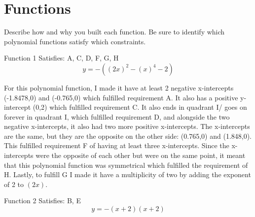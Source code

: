 \documentclass[pstricks,border=11pt]{article}
\begin{document}
\vspace{15mm}
\section{Functions}
Describe how and why you built each function. Be sure to identify which polynomial functions satisfy which constraints.

\hfill \break
Function 1
\hfill \break
Satisfies: A, C, D, F, G, H
\begin{displaymath}
    y=-((2x)^2-(x)^4-2)   
\end{displaymath}

\vspace{5mm}
\begin{center}
\end{center}
\vspace{5mm}

For this polynomial function, I made it have at least 2 negative x-intercepts (-1.8478,0) and (-0.765,0) which fulfilled requirement A. It also has a positive y-intercept (0,2) which fulfilled requirement C. It also ends in quadrant I/ goes on forever in quadrant I, which fulfilled requirement D, and alongside the two negative x-intercepts, it also had two more positive x-intercepts. The x-intercepts are the same, but they are the opposite on the other side: (0.765,0) and (1.848,0). This fulfilled requirement F of having at least three x-intercepts. Since the x-intercepts were the opposite of each other but were on the same point, it meant that this polynomial function was symmetrical which fulfilled the requirement of H. Lastly, to fulfill G I made it have a multiplicity of two by adding the exponent of 2 to $(2x)$.


\vspace{35mm} %
\hfill \break
Function 2
\hfill \break
Satisfies: B, E
\begin{displaymath}
    y=-(x+2)(x+2)
\end{displaymath}
\end{document}
